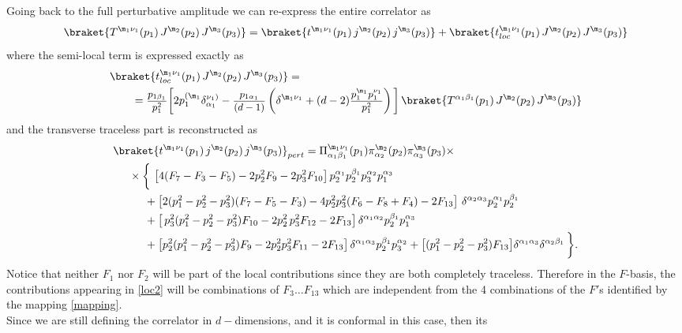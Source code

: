 \documentclass[a4paper,11pt,openright,twoside]{book}
\let\a=\alpha   \let\b=\beta   \let\g=\gamma   \let\d=\delta
\let\n=\nu      \let\x=\xi     \let\p=\pi      \let\r=\rho
\newcommand{\sdfrac}[2]{\mbox{\small$\displaystyle\frac{#1}{#2}$}}
\numberwithin{equation}{section}
\begin{document}
{{Going back to the full perturbative amplitude we can re-express the entire correlator as
\begin{equation}
	\braket{T^{\m_1\n_1}(p_1)\,J^{\m_2}(p_2)\,J^{\m_3}(p_3)}=\braket{t^{\m_1\n_1}(p_1)\,j^{\m_2}(p_2)\,j^{\m_3}(p_3)}+\braket{t^{\m_1\n_1}_{loc}(p_1)\,J^{\m_2}(p_2)\,J^{\m_3}(p_3)}
\end{equation}
where the semi-local term is expressed exactly as
\begin{align}
	&\braket{t^{\m_1\n_1}_{loc}(p_1)\,J^{\m_2}(p_2)\,J^{\m_3}(p_3)}=\notag\\
	&\qquad=\sdfrac{p_{1\b_1}}{p_1^2}\bigg[2p_1^{(\m_1}\d^{\n_1)}_{\a_1}-\sdfrac{p_{1\a_1}}{(d-1)}\left(\d^{\m_1\n_1}+(d-2)\sdfrac{p_1^{\m_1}p_1^{\n_1}}{p_1^2}\right)\bigg]\,\braket{T^{\a_1\b_1}(p_1)\,J^{\m_2}(p_2)\,J^{\m_3}(p_3)}
	\label{loc2}
\end{align}
and the transverse traceless part is reconstructed as 
\begin{align}
	&\braket{{t^{\m_1\n_1}(p_1)\,j^{\m_2}(p_2)\,j^{\m_3}(p_3)}}_{pert}=\Pi^{\m_1\n_1}_{\a_1\b_1}(p_1)\pi^{\m_2}_{\a_2}(p_2)\pi^{\m_3}_{\a_3}(p_3)\times\notag\\
	&\hspace{0.5cm}\times \bigg\{\ \big[4(F_7-F_3-F_5)-2p_2^2F_9-2p_3^2F_{10}\big]\,p_2^{\a_1}p_2^{\b_1}p_3^{\a_2}p_1^{\a_3}\notag\\
	&\hspace{1cm}+ \big[2(p_1^2-p_2^2-p_3^2)(F_7-F_5-F_3)-4p_2^2p_3^2(F_6-F_8+F_4)-2F_{13}\big]\ \d^{\a_2\a_3} p_2^{\a_1}p_2^{\b_1}\notag\\
	&\hspace{1cm} +\big[\,p_3^2(p_1^2-p_2^2-p_3^2)F_{10}-2p_2^2\,p_3^2 F_{12}-2F_{13}\big]\,\d^{\a_1\a_2}p_2^{\b_1}p_1^{\a_3}\notag\\
	&\hspace{1cm} +\big[p_2^2(p_1^2-p_2^2-p_3^2)F_9-2p_2^2p_3^2F_{11}-2F_{13}\big]\,\d^{\a_1\a_3}p_2^{\b_1}p_3^{\a_2}+ \big[(p_1^2-p_2^2-p_3^2)F_{13}\big]\d^{\a_1\a_3}\d^{\a_2\b_1}\,\bigg\}.
\end{align}
Notice that neither $F_1$ nor $F_2$ will be part of the local contributions since they are both 
completely traceless. Therefore in the $F$-basis, the contributions appearing in \eqref{loc2} will 
be combinations of $F_3\ldots F_{13}$ which are independent from the 4 combinations of the $F'$s identified by the mapping \eqref{mapping}.\\
Since we are still defining the correlator in $d-$dimensions, and it is conformal in this case, then its 
}}
\end{document}
